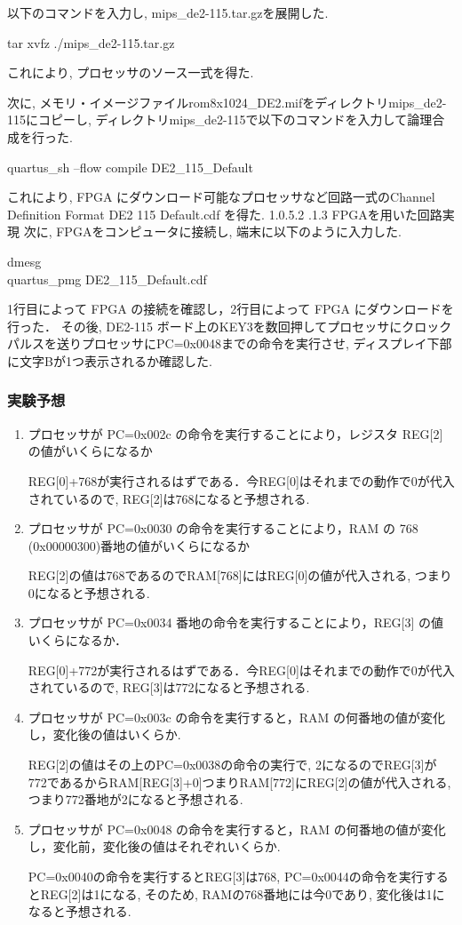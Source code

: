 \documentclass[epsf,a4paper,dvipdfmx,autodetect-engine,titlepage]{jsarticle}
\makeatletter
\newcommand{\subsubsubsection}
{\@startsection{paragraph}{4}{\z@}%
{1.0\Cvs \@plus.5\Cdp \@minus.2\Cdp}%
{.1\Cvs \@plus.3\Cdp}%
{\reset@font\sffamily\normalsize}}
\makeatother
\begin{document}
以下のコマンドを入力し, mips\_de2-115.tar.gzを展開した.
\begin{screen}
tar xvfz ./mips\_de2-115.tar.gz
\end{screen}
これにより, プロセッサのソース一式を得た.\par
次に, メモリ・イメージファイルrom8x1024\_DE2.mifをディレクトリmips\_de2-115にコピーし, ディレクトリmips\_de2-115で以下のコマンドを入力して論理合成を行った.
\begin{screen}
quartus\_sh --flow compile DE2\_115\_Default
\end{screen}
これにより,  FPGA にダウンロード可能なプロセッサなど回路一式のChannel Definition Format DE2 115 Default.cdf を得た.
\subsubsubsection{FPGAを用いた回路実現}
次に, FPGAをコンピュータに接続し, 端末に以下のように入力した.
\begin{screen}
dmesg \\
quartus\_pmg DE2\_115\_Default.cdf
\end{screen}
1行目によって FPGA の接続を確認し，2行目によって FPGA にダウンロードを行った．
その後, DE2-115 ボード上のKEY3を数回押してプロセッサにクロックパルスを送りプロセッサにPC=0x0048までの命令を実行させ, ディスプレイ下部に文字Bが1つ表示されるか確認した. 
\subsubsection{実験予想}
\begin{enumerate}
    \item プロセッサが PC=0x002c の命令を実行することにより，レジスタ REG[2] の値がいくらになるか\par
    REG[0]+768が実行されるはずである．今REG[0]はそれまでの動作で0が代入されているので, REG[2]は768になると予想される.

    \item プロセッサが PC=0x0030 の命令を実行することにより，RAM の 768 (0x00000300)番地の値がいくらになるか\par
    REG[2]の値は768であるのでRAM[768]にはREG[0]の値が代入される, つまり0になると予想される.

    \item プロセッサが PC=0x0034 番地の命令を実行することにより，REG[3] の値いくらになるか．\par
    REG[0]+772が実行されるはずである．今REG[0]はそれまでの動作で0が代入されているので, REG[3]は772になると予想される.

    \item プロセッサが PC=0x003c の命令を実行すると，RAM の何番地の値が変化し，変化後の値はいくらか.\par
    REG[2]の値はその上のPC=0x0038の命令の実行で, 2になるのでREG[3]が772であるからRAM[REG[3]+0]つまりRAM[772]にREG[2]の値が代入される, つまり772番地が2になると予想される.

    \item プロセッサが PC=0x0048 の命令を実行すると，RAM の何番地の値が変化し，変化前，変化後の値はそれぞれいくらか.\par
    PC=0x0040の命令を実行するとREG[3]は768, PC=0x0044の命令を実行するとREG[2]は1になる, そのため, RAMの768番地には今0であり, 変化後は1になると予想される. 
\end{enumerate}
\end{document}
